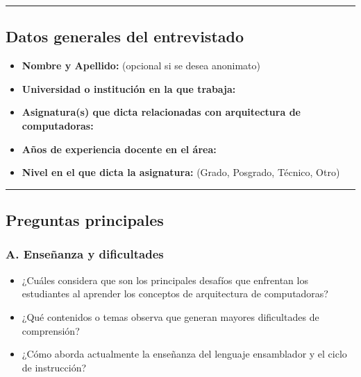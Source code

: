 \documentclass[12pt,oneside]{templates/unerthesis}
\providecommand{\tightlist}{%
  \setlength{\itemsep}{0pt}\setlength{\parskip}{0pt}}
\begin{document}
\begin{center}\rule{0.5\linewidth}{0.5pt}\end{center}

\hypertarget{datos-generales-del-entrevistado}{%
\subsection{Datos generales del entrevistado}\label{datos-generales-del-entrevistado}}

\begin{itemize}
\tightlist
\item
  \textbf{Nombre y Apellido:} (opcional si se desea anonimato)
\item
  \textbf{Universidad o institución en la que trabaja:}
\item
  \textbf{Asignatura(s) que dicta relacionadas con arquitectura de computadoras:}
\item
  \textbf{Años de experiencia docente en el área:}
\item
  \textbf{Nivel en el que dicta la asignatura:} (Grado, Posgrado, Técnico, Otro)
\end{itemize}

\begin{center}\rule{0.5\linewidth}{0.5pt}\end{center}

\hypertarget{preguntas-principales}{%
\subsection{Preguntas principales}\label{preguntas-principales}}

\hypertarget{a.-enseuxf1anza-y-dificultades}{%
\subsubsection{A. Enseñanza y dificultades}\label{a.-enseuxf1anza-y-dificultades}}

\begin{itemize}
\tightlist
\item
  ¿Cuáles considera que son los principales desafíos que enfrentan los estudiantes al aprender los conceptos de arquitectura de computadoras?
\item
  ¿Qué contenidos o temas observa que generan mayores dificultades de comprensión?
\item
  ¿Cómo aborda actualmente la enseñanza del lenguaje ensamblador y el ciclo de instrucción?
\end{itemize}
\end{document}
